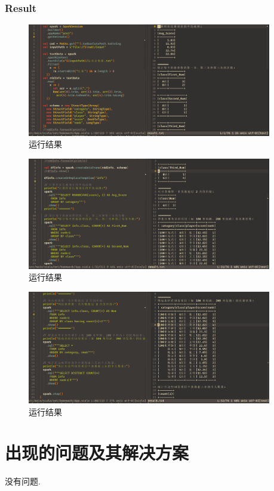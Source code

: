 \documentclass{article}
\begin{document}
\subsubsection{Result}
\begin{figure}[H]
  \begin{center}
    \includegraphics[width=0.95\textwidth]{./figures/3-0.png}
  \end{center}
  \caption{运行结果}
\end{figure}
\begin{figure}[H]
  \begin{center}
    \includegraphics[width=0.95\textwidth]{./figures/3-1.png}
  \end{center}
  \caption{运行结果}
\end{figure}
\begin{figure}[H]
  \begin{center}
    \includegraphics[width=0.95\textwidth]{./figures/3-2.png}
  \end{center}
  \caption{运行结果}
\end{figure}

\section{出现的问题及其解决方案}
没有问题.
\end{document}
